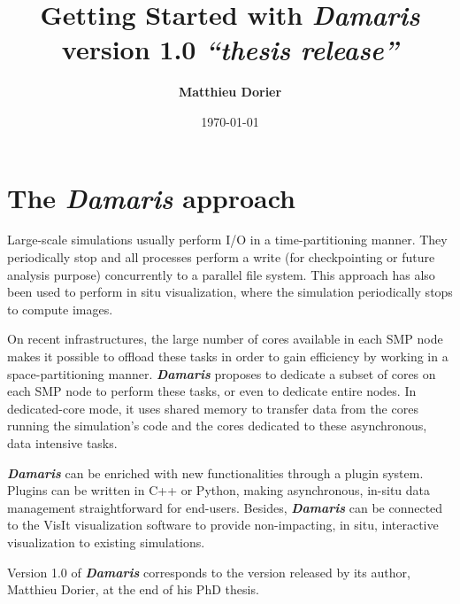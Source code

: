 \documentclass[11pt]{report}
\newcommand{\Damaris}{\emph{\textbf{Damaris}}}
\begin{document}
\title{\Huge{ 
	 Getting Started with \Damaris{}} \\
	\normalsize{} version 1.0 \emph{``thesis release''}}
\author{\textbf{Matthieu Dorier}}
\date{\today}
\maketitle

\setcounter{tocdepth}{1}
\tableofcontents

\chapter*{The \Damaris{} approach}

Large-scale simulations usually perform I/O in a time-partitioning manner.
They periodically stop and all processes perform a write (for checkpointing
or future analysis purpose) concurrently to a parallel file system. 
This approach has also been used to perform in situ visualization, 
where the simulation periodically stops to compute images.

On recent infrastructures, the large number of cores available in each SMP node makes
it possible to offload these tasks in order to gain efficiency by working 
in a space-partitioning manner.
\Damaris{} proposes to dedicate a subset of cores on each SMP node to perform these tasks,
or even to dedicate entire nodes.
In dedicated-core mode, it uses shared memory to transfer data from the cores 
running the simulation's code and the cores dedicated to these asynchronous,
data intensive tasks.

\Damaris{} can be enriched with new functionalities through a plugin system. 
Plugins can be written in C++ or Python, making asynchronous, 
in-situ data management straightforward for end-users.
Besides, \Damaris{} can be connected to the VisIt visualization software to provide
non-impacting, in situ, interactive visualization to existing simulations.

Version 1.0 of \Damaris{} corresponds to the version released by its author,
Matthieu Dorier, at the end of his PhD thesis.

\end{document}
